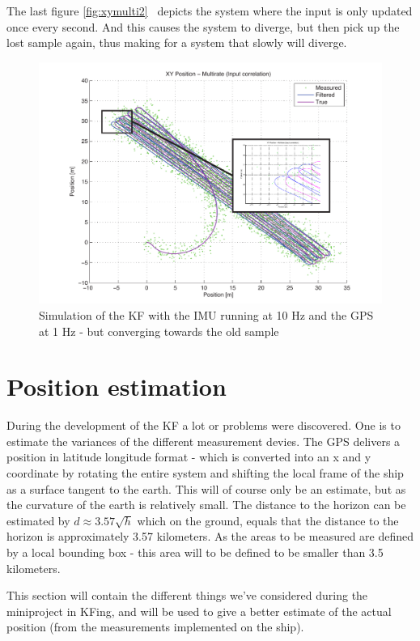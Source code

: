 The last figure \vref{fig:xymulti2}  depicts the system where the input is only updated once every second. And this causes the system to diverge, but then pick up the lost sample again, thus making for a system that slowly will diverge.

\begin{figure}[htbp]
	\centering
	\includegraphics[width=\textwidth]{img/xymnirate}
	\caption{Simulation of the \ac{KF} with the \ac{IMU} running at 10 Hz and the \ac{GPS} at 1 Hz - but converging towards the old sample}
	\label{fig:xymulti2}
\end{figure}

\section{Position estimation}
During the development of the \ac{KF} a lot or problems were discovered. One is to estimate the variances of the different measurement devies. The GPS delivers a position in latitude longitude format - which is converted into an x and y coordinate by rotating the entire system and shifting the local frame of the ship as a surface tangent to the earth. This will of course only be an estimate, but as the curvature of the earth is relatively small. The distance to the horizon can be estimated by $d \approx 3.57\sqrt{h}$ which on the ground, equals that the distance to the horizon is approximately 3.57 kilometers. As the areas to be measured are defined by a local bounding box - this area will to be defined to be smaller than 3.5 kilometers.

This section will contain the different things we've considered during the miniproject in \ac{KF}ing, and will be used to give a better estimate of the actual position (from the measurements implemented on the ship).


